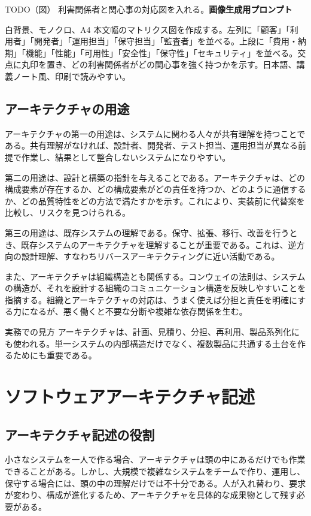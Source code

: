 \documentclass[a4paper,11pt]{ltjsarticle}
\newcommand{\todofig}[2]{\begin{statementbox}{TODO（図） #1}\textbf{画像生成用プロンプト}\par #2\end{statementbox}}
\begin{document}
\todofig{利害関係者と関心事の対応図を入れる。}{白背景、モノクロ、A4 本文幅のマトリクス図を作成する。左列に「顧客」「利用者」「開発者」「運用担当」「保守担当」「監査者」を並べる。上段に「費用・納期」「機能」「性能」「可用性」「安全性」「保守性」「セキュリティ」を並べる。交点に丸印を置き、どの利害関係者がどの関心事を強く持つかを示す。日本語、講義ノート風、印刷で読みやすい。}

\subsection{アーキテクチャの用途}
アーキテクチャの第一の用途は、システムに関わる人々が共有理解を持つことである。共有理解がなければ、設計者、開発者、テスト担当、運用担当が異なる前提で作業し、結果として整合しないシステムになりやすい。

第二の用途は、設計と構築の指針を与えることである。アーキテクチャは、どの構成要素が存在するか、どの構成要素がどの責任を持つか、どのように通信するか、どの品質特性をどの方法で満たすかを示す。これにより、実装前に代替案を比較し、リスクを見つけられる。

第三の用途は、既存システムの理解である。保守、拡張、移行、改善を行うとき、既存システムのアーキテクチャを理解することが重要である。これは、逆方向の設計理解、すなわちリバースアーキテクティングに近い活動である。

また、アーキテクチャは組織構造とも関係する。コンウェイの法則は、システムの構造が、それを設計する組織のコミュニケーション構造を反映しやすいことを指摘する。組織とアーキテクチャの対応は、うまく使えば分担と責任を明確にする力になるが、悪く働くと不要な分断や複雑な依存関係を生む。

\begin{statementbox}{実務での見方}
アーキテクチャは、計画、見積り、分担、再利用、製品系列化にも使われる。単一システムの内部構造だけでなく、複数製品に共通する土台を作るためにも重要である。
\end{statementbox}

\section{ソフトウェアアーキテクチャ記述}

\subsection*{アーキテクチャ記述の役割}
小さなシステムを一人で作る場合、アーキテクチャは頭の中にあるだけでも作業できることがある。しかし、大規模で複雑なシステムをチームで作り、運用し、保守する場合には、頭の中の理解だけでは不十分である。人が入れ替わり、要求が変わり、構成が進化するため、アーキテクチャを具体的な成果物として残す必要がある。
\end{document}
